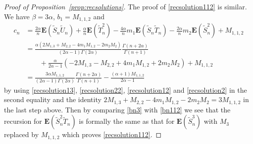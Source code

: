 \documentclass[12pt,a4paper]{article}
\newcommand{\E}{\mathbf E}
\newcommand{\wt}{\widetilde}
\numberwithin{equation}{section}
\begin{document}
\begin{proof}[Proof of Proposition~\ref{prop:recsolutions}]
The proof of \eqref{recsolution112} is similar.
We have $\beta=3\alpha$, $b_1=M_{1,1,2}$ and
\begin{equation}\label{bn112}\begin{aligned}
c_n&=\frac{2\alpha}n\E(\wt S_n\wt U_n)+\frac\alpha n\E(\wt T_n^2)-\frac{4\alpha}nm_1\E(\wt S_n\wt T_n)-\frac{2\alpha}nm_2\E(\wt S_n^2)+M_{1,1,2}\\
&=\frac{\alpha(2M_{1,3}+M_{2,2}-4m_1M_{1,2}-2m_2M_2)}{(2\alpha-1)\Gamma(2\alpha)}\frac{\Gamma(n+2\alpha)}{\Gamma(n+1)}\\
&\qquad+\frac\alpha{2\alpha-1}(-2M_{1,3}-M_{2,2}+4m_1M_{1,2}+2m_2M_2)+M_{1,1,2}\\
&=\frac{3\alpha M_{1,1,2}}{(2\alpha-1)\Gamma(2\alpha)}\frac{\Gamma(n+2\alpha)}{\Gamma(n+1)}-\frac{(\alpha+1)M_{1,1,2}}{2\alpha-1}
\end{aligned}\end{equation}
by using \eqref{recsolution13}, \eqref{recsolution22}, \eqref{recsolution12} and \eqref{recsolution2} in the second equality
and the identity $2M_{1,3}+M_{2,2}-4m_1M_{1,2}-2m_2M_2=3M_{1,1,2}$ in the last step above.
Then by comparing \eqref{bn3} with \eqref{bn112} we see that the recursion for $\E(\wt S_n^2\wt T_n)$ is formally the same as that for $\E(\wt S_n^3)$
with $M_3$ replaced by $M_{1,1,2}$ which proves \eqref{recsolution112}.


\end{proof}
\end{document}
